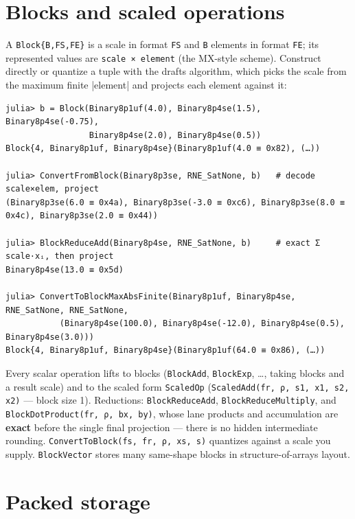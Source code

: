 \section{Blocks and scaled operations}



\label{17754733778172498420}{}


A \texttt{Block\{B,FS,FE\}} is a scale in format \texttt{FS} and \texttt{B} elements in format \texttt{FE}; its represented values are \texttt{scale × element} (the MX-style scheme). Construct directly or quantize a tuple with the draft{\textquotesingle}s algorithm, which picks the scale from the maximum finite |element| and projects each element against it:




\begin{verbatim}
julia> b = Block(Binary8p1uf(4.0), Binary8p4se(1.5), Binary8p4se(-0.75),
                 Binary8p4se(2.0), Binary8p4se(0.5))
Block{4, Binary8p1uf, Binary8p4se}(Binary8p1uf(4.0 ≡ 0x82), (…))

julia> ConvertFromBlock(Binary8p3se, RNE_SatNone, b)   # decode scale×elem, project
(Binary8p3se(6.0 ≡ 0x4a), Binary8p3se(-3.0 ≡ 0xc6), Binary8p3se(8.0 ≡ 0x4c), Binary8p3se(2.0 ≡ 0x44))

julia> BlockReduceAdd(Binary8p4se, RNE_SatNone, b)     # exact Σ scale·xᵢ, then project
Binary8p4se(13.0 ≡ 0x5d)

julia> ConvertToBlockMaxAbsFinite(Binary8p1uf, Binary8p4se, RNE_SatNone, RNE_SatNone,
           (Binary8p4se(100.0), Binary8p4se(-12.0), Binary8p4se(0.5), Binary8p4se(3.0)))
Block{4, Binary8p1uf, Binary8p4se}(Binary8p1uf(64.0 ≡ 0x86), (…))
\end{verbatim}



Every scalar operation lifts to blocks (\texttt{BlockAdd}, \texttt{BlockExp}, …, taking blocks and a result scale) and to the scaled form \texttt{ScaledOp} (\texttt{ScaledAdd(fr, ρ, s1, x1, s2, x2)} — block size 1). Reductions: \texttt{BlockReduceAdd}, \texttt{BlockReduceMultiply}, and \texttt{BlockDotProduct(fr, ρ, bx, by)}, whose lane products and accumulation are \textbf{exact} before the single final projection — there is no hidden intermediate rounding. \texttt{ConvertToBlock(fs, fr, ρ, xs, s)} quantizes against a scale you supply. \texttt{BlockVector} stores many same-shape blocks in structure-of-arrays layout.



\section{Packed storage}



